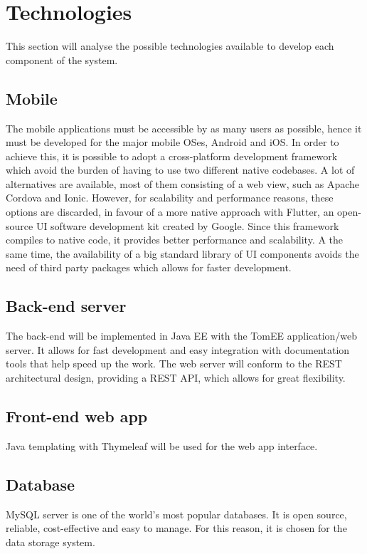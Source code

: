 \clearpage

\section{Technologies}\label{iit:tech}
This section will analyse the possible technologies available to develop each component of the system.

\subsection{Mobile}
The mobile applications must be accessible by as many users as possible, hence it must be developed for the major mobile OSes, Android and iOS.
In order to achieve this, it is possible to adopt a cross-platform development framework which  avoid the burden of having to use two different native codebases.
A lot of alternatives are available, most of them consisting of a web view, such as Apache Cordova and Ionic. 
However, for scalability and performance reasons, these options are discarded, in favour of a more native approach with Flutter, an open-source UI software development kit created by Google.
Since this framework compiles to native code, it provides better performance and scalability. A the same time, the availability of a big standard library of UI components avoids the need of third party packages which allows for faster development.

\subsection{Back-end server}
The back-end will be implemented in Java EE with the TomEE application/web server.
It allows for fast development and easy integration with documentation tools that help speed up the work.\newline
The web server will conform to the REST architectural design, providing a REST API, which allows for great flexibility.
 
\subsection{Front-end web app}
Java templating with Thymeleaf will be used for the web app interface.

\subsection{Database}
MySQL server is one of the world’s most popular databases. It is open source, reliable, cost-effective and easy to manage. For this reason, it is chosen for the data storage system.

